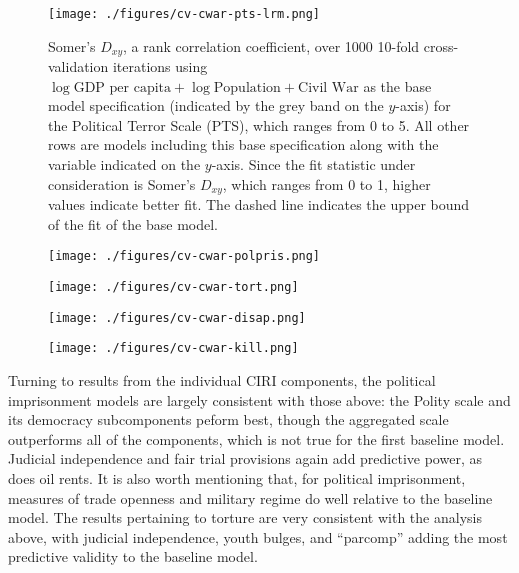 \documentclass[12pt]{article}
\begin{document}
\begin{figure}[!htpb]
\centering
\texttt{[image: ./figures/cv-cwar-pts-lrm.png]}
\caption{Somer's $D_{xy}$, a rank correlation coefficient, over 1000 10-fold cross-validation iterations using $\log \text{GDP per capita} + \log \text{Population} + \text{Civil War}$ as the base model specification (indicated by the grey band on the $y$-axis) for the Political Terror Scale (PTS), which ranges from 0 to 5. All other rows are models including this base specification along with the variable indicated on the $y$-axis. Since the fit statistic under consideration is Somer's $D_{xy}$, which ranges from 0 to 1, higher values indicate better fit. The dashed line indicates the upper bound of the fit of the base model.}
\caption{}
\label{cv-cwar-pts-lrm}
\end{figure}

\begin{figure}[!htpb]
\centering
\texttt{[image: ./figures/cv-cwar-polpris.png]}
\caption{}
\label{cv-cwar-polpris}
\end{figure}

\begin{figure}[!htpb]
\centering
\texttt{[image: ./figures/cv-cwar-tort.png]}
\caption{}
\end{figure}

\begin{figure}[!htpb]
\centering
\texttt{[image: ./figures/cv-cwar-disap.png]}
\caption{}
\label{cv-cwar-disap}
\end{figure}

\begin{figure}[!htpb]
\centering
\texttt{[image: ./figures/cv-cwar-kill.png]}
\caption{}
\label{cv-cwar-kill}
\end{figure}

Turning to results from the individual CIRI components, the political imprisonment models are largely consistent with those above: the Polity scale and its democracy subcomponents peform best, though the aggregated scale outperforms all of the components, which is not true for the first baseline model. Judicial independence and fair trial provisions again add predictive power, as does oil rents. It is also worth mentioning that, for political imprisonment, measures of trade openness and military regime do well relative to the baseline model. The results pertaining to torture are very consistent with the analysis above, with judicial independence, youth bulges, and ``parcomp'' adding the most predictive validity to the baseline model. 
\end{document}
